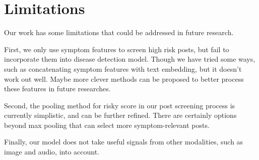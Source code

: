 \section*{Limitations}
\label{sec:limitations}

Our work has some limitations that could be addressed in future research. 

First, we only use symptom features to screen high risk posts, but  fail to incorporate them into disease detection model. Though we have tried some ways, such as concatenating symptom features with text embedding, but it doesn't work out well. Maybe more clever methods can be proposed to better process these features in future researches.

Second, the pooling method for risky score in our post screening process is currently simplistic, and can be further refined. There are certainly options beyond max pooling that can select more symptom-relevant posts.

Finally, our model does not take useful signals from other modalities, such as image and audio, into account. 